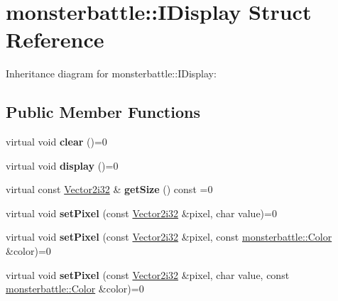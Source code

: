 \hypertarget{structmonsterbattle_1_1IDisplay}{}\section{monsterbattle\+:\+:I\+Display Struct Reference}
\label{structmonsterbattle_1_1IDisplay}


Inheritance diagram for monsterbattle\+:\+:I\+Display\+:
\subsection*{Public Member Functions}
\begin{DoxyCompactItemize}
\item 
\mbox{\label{structmonsterbattle_1_1IDisplay_a47fcdb806a20c70e2e273eb01c07eb43}} 
virtual void {\bfseries clear} ()=0
\item 
\mbox{\label{structmonsterbattle_1_1IDisplay_a4a7de3bfe39f49b421e1d3a14a09d618}} 
virtual void {\bfseries display} ()=0
\item 
\mbox{\label{structmonsterbattle_1_1IDisplay_af86048e2a1c5f21e375a9931ae97b2c5}} 
virtual const \hyperlink{structmonsterbattle_1_1Vector}{Vector2i32} \& {\bfseries get\+Size} () const =0
\item 
\mbox{\label{structmonsterbattle_1_1IDisplay_aeb2e08e3737c5dbe03dd3ab42ecda3bb}} 
virtual void {\bfseries set\+Pixel} (const \hyperlink{structmonsterbattle_1_1Vector}{Vector2i32} \&pixel, char value)=0
\item 
\mbox{\label{structmonsterbattle_1_1IDisplay_a7f961171d3841f0aa417baf21c5a16f7}} 
virtual void {\bfseries set\+Pixel} (const \hyperlink{structmonsterbattle_1_1Vector}{Vector2i32} \&pixel, const \hyperlink{structmonsterbattle_1_1Color}{monsterbattle\+::\+Color} \&color)=0
\item 
\mbox{\label{structmonsterbattle_1_1IDisplay_a89645e015942e79a65a61bddd068f01c}} 
virtual void {\bfseries set\+Pixel} (const \hyperlink{structmonsterbattle_1_1Vector}{Vector2i32} \&pixel, char value, const \hyperlink{structmonsterbattle_1_1Color}{monsterbattle\+::\+Color} \&color)=0

\end{DoxyCompactItemize}
